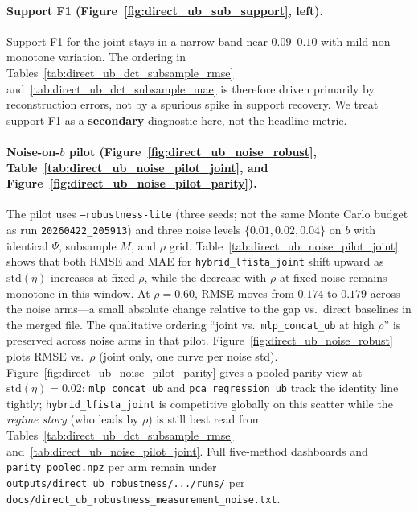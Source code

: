 \paragraph{Support F1 (Figure~\ref{fig:direct_ub_sub_support}, left).}
Support F1 for the joint stays in a narrow band near $0.09$--$0.10$ with mild non-monotone variation. The ordering in Tables~\ref{tab:direct_ub_dct_subsample_rmse} and~\ref{tab:direct_ub_dct_subsample_mae} is therefore driven primarily by reconstruction errors, not by a spurious spike in support recovery. We treat support F1 as a \textbf{secondary} diagnostic here, not the headline metric.

\paragraph{Noise-on-$b$ pilot (Figure~\ref{fig:direct_ub_noise_robust}, Table~\ref{tab:direct_ub_noise_pilot_joint}, and Figure~\ref{fig:direct_ub_noise_pilot_parity}).}
The pilot uses \texttt{--robustness-lite} (three seeds; not the same Monte Carlo budget as run \texttt{20260422\_205913}) and three noise levels $\{0.01,0.02,0.04\}$ on $b$ with identical $\Psi$, subsample $M$, and $\rho$ grid. Table~\ref{tab:direct_ub_noise_pilot_joint} shows that both RMSE and MAE for \texttt{hybrid\_lfista\_joint} shift upward as $\mathrm{std}(\eta)$ increases at fixed $\rho$, while the decrease with $\rho$ at fixed noise remains monotone in this window. At $\rho=0.60$, RMSE moves from $0.174$ to $0.179$ across the noise arms---a small absolute change relative to the gap vs.\ direct baselines in the merged file. The qualitative ordering ``joint vs.\ \texttt{mlp\_concat\_ub} at high $\rho$'' is preserved across noise arms in that pilot. Figure~\ref{fig:direct_ub_noise_robust} plots RMSE vs.\ $\rho$ (joint only, one curve per noise std). Figure~\ref{fig:direct_ub_noise_pilot_parity} gives a pooled parity view at $\mathrm{std}(\eta)=0.02$: \texttt{mlp\_concat\_ub} and \texttt{pca\_regression\_ub} track the identity line tightly; \texttt{hybrid\_lfista\_joint} is competitive globally on this scatter while the \emph{regime story} (who leads by $\rho$) is still best read from Tables~\ref{tab:direct_ub_dct_subsample_rmse} and~\ref{tab:direct_ub_noise_pilot_joint}. Full five-method dashboards and \texttt{parity\_pooled.npz} per arm remain under \texttt{outputs/direct\_ub\_robustness/.../runs/} per \texttt{docs/direct\_ub\_robustness\_measurement\_noise.txt}.

